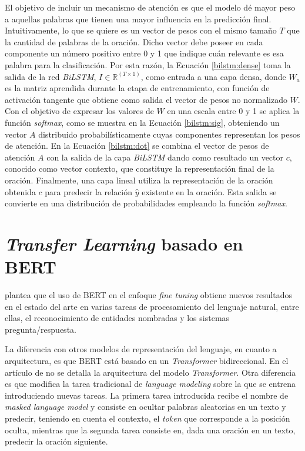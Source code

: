 El objetivo de incluir un mecanismo de atención es que el modelo dé mayor peso a aquellas palabras que tienen una mayor influencia en la predicción final. Intuitivamente, lo que se quiere es un vector de pesos con el mismo tamaño $T$ que la cantidad de palabras de la oración. Dicho vector debe poseer en cada componente un número positivo entre 0 y 1 que indique cuán relevante es esa palabra para la clasificación. Por esta razón, la Ecuación \ref{bilstm:dense} toma la salida de la red \textit{BiLSTM}, $I \in {\mathbb{R}}^{(T \times 1)}$, como entrada a una capa densa, donde $W_{a}$ es la matriz aprendida durante la etapa de entrenamiento, con función de activación tangente que obtiene como salida el vector de pesos no normalizado $W$. Con el objetivo de expresar los valores de $W$ en una escala entre 0 y 1 se aplica la función \textit{softmax}, como se muestra en la Ecuación \ref{bilstm:sig}, obteniendo un vector $A$ distribuido probabilísticamente cuyas componentes representan los pesos de atención. En la Ecuación \ref{bilstm:dot} se combina el vector de pesos de atención $A$ con la salida de la capa \textit{BiLSTM} dando como resultado un vector $c$, conocido como vector contexto, que constituye la representación final de la oración. Finalmente, una capa lineal utiliza la representación de la oración obtenida $c$ para predecir la relación $\hat{y}$ existente en la oración. Esta salida se convierte en una distribución de probabilidades empleando la función \textit{softmax}.

\section{\textit{Transfer Learning} basado en BERT}\label{bert_t}

\cite{2018-devlin-bert} plantea que el uso de BERT en el enfoque \textit{fine tuning} obtiene nuevos resultados en el estado del arte en varias tareas de procesamiento del lenguaje natural, entre ellas, el reconocimiento de entidades nombradas y los sistemas pregunta/respuesta.

La diferencia con otros modelos de representación del lenguaje, en cuanto a arquitectura, es que BERT está basado en un \textit{Transformer} bidireccional. En el artículo de \cite{2018-devlin-bert} no se detalla la arquitectura del modelo \textit{Transformer}. Otra diferencia es que modifica la tarea tradicional de \textit{language modeling} sobre la que se entrena introduciendo nuevas tareas. La primera tarea introducida recibe el nombre de \textit{masked language model} y consiste en ocultar palabras aleatorias en un texto y predecir, teniendo en cuenta el contexto, el \textit{token} que corresponde a la posición oculta, mientras que la segunda tarea consiste en, dada una oración en un texto, predecir la oración siguiente.

